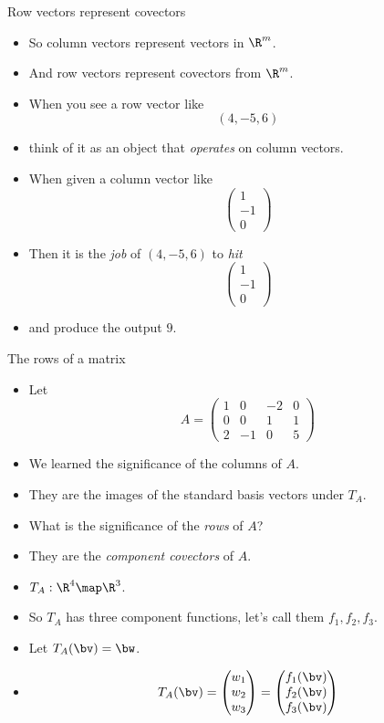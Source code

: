 \documentclass{beamer}
\begin{document}
\begin{frame}{Row vectors represent covectors}
\begin{itemize}
\item So column vectors represent vectors in $\R^m$.
\item And row vectors represent covectors from $\R^m$.
\item When you see a row vector like
$$(4, -5, 6)$$
\item think of it as an object that \emph{operates} on column vectors.
\item When given a column vector like
$$
\begin{pmatrix}
1 \\ -1 \\ 0
\end{pmatrix}
$$
\item Then it is the \emph{job} of $(4, -5, 6)$ to \emph{hit}
$$
\begin{pmatrix}
1 \\ -1 \\ 0
\end{pmatrix}
$$
\item and produce the output $9$.
\end{itemize}
\end{frame}


\begin{frame}{The rows of a matrix}
\begin{itemize}
\item Let
$$A =
\begin{pmatrix}
1 &  0 & -2 & 0 \\
0 &  0 &  1 & 1 \\
2 & -1 &  0 & 5
\end{pmatrix}
$$
\item We learned the significance of the columns of $A$.
\item They are the images of the standard basis vectors under $T_A$.
\item What is the significance of the \emph{rows} of $A$?
\item They are the \emph{component covectors} of $A$.
\item $T_A:\R^4\map\R^3$.
\item So $T_A$ has three component functions, let's call them $f_1, f_2, f_3$.
\item Let $T_A(\bv) = \bw$.
\item
$$T_A(\bv) =
\begin{pmatrix}
w_1 \\ w_2 \\ w_3
\end{pmatrix}
=
\begin{pmatrix}
f_1(\bv) \\ f_2(\bv) \\ f_3(\bv)
\end{pmatrix}
$$
\end{itemize}
\end{frame}
\end{document}
